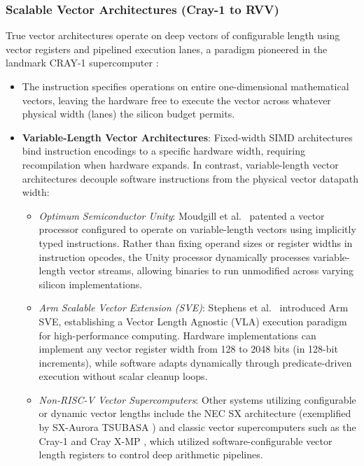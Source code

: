 \subsubsection{Scalable Vector Architectures (Cray-1 to RVV)}
True vector architectures operate on deep vectors of configurable length using vector registers and pipelined execution lanes, a paradigm pioneered in the landmark CRAY-1 supercomputer \cite{cray1978cray1}:
\begin{itemize}
    \item The instruction specifies operations on entire one-dimensional mathematical vectors, leaving the hardware free to execute the vector across whatever physical width (lanes) the silicon budget permits.
    
    \item \textbf{Variable-Length Vector Architectures}: Fixed-width SIMD architectures bind instruction encodings to a specific hardware width, requiring recompilation when hardware expands. In contrast, variable-length vector architectures decouple software instructions from the physical vector datapath width:
    \begin{itemize}
        \item \textit{Optimum Semiconductor Unity}: Moudgill et al.~\cite{moudgill2018unity} patented a vector processor configured to operate on variable-length vectors using implicitly typed instructions. Rather than fixing operand sizes or register widths in instruction opcodes, the Unity processor dynamically processes variable-length vector streams, allowing binaries to run unmodified across varying silicon implementations.
        \item \textit{Arm Scalable Vector Extension (SVE)}: Stephens et al.~\cite{stephens2017arm} introduced Arm SVE, establishing a Vector Length Agnostic (VLA) execution paradigm for high-performance computing. Hardware implementations can implement any vector register width from 128 to 2048 bits (in 128-bit increments), while software adapts dynamically through predicate-driven execution without scalar cleanup loops.
        \item \textit{Non-RISC-V Vector Supercomputers}: Other systems utilizing configurable or dynamic vector lengths include the NEC SX architecture (exemplified by SX-Aurora TSUBASA \cite{komatsu2018aurora}) and classic vector supercomputers such as the Cray-1 and Cray X-MP \cite{cray1978cray1}, which utilized software-configurable vector length registers to control deep arithmetic pipelines.
    \end{itemize}
\end{itemize}

